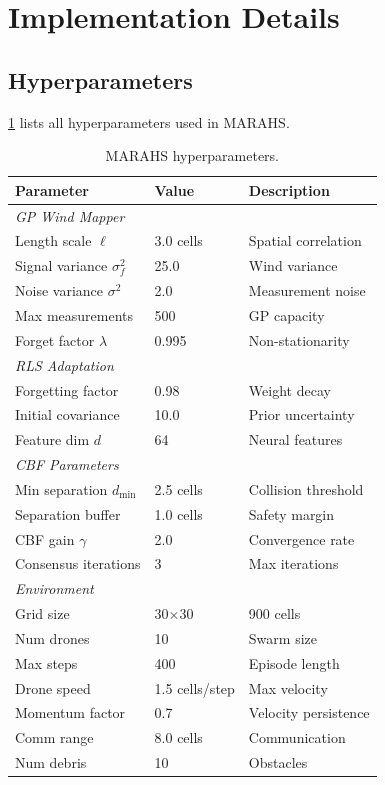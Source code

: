 \documentclass[11pt,twocolumn]{article}
\providecommand{\Cref}[1]{\ref{#1}}
\theoremstyle{definition}
\begin{document}
\section{Implementation Details}
\label{app:implementation}

\subsection{Hyperparameters}

\Cref{tab:hyperparameters} lists all hyperparameters used in MARAHS.

\begin{table}[h]
\centering
\caption{MARAHS hyperparameters.}
\label{tab:hyperparameters}
\small
\begin{tabular}{lll}
\toprule
\textbf{Parameter} & \textbf{Value} & \textbf{Description} \\
\midrule
\multicolumn{3}{l}{\textit{GP Wind Mapper}} \\
Length scale $\ell$ & 3.0 cells & Spatial correlation \\
Signal variance $\sigma_f^2$ & 25.0 & Wind variance \\
Noise variance $\sigma^2$ & 2.0 & Measurement noise \\
Max measurements & 500 & GP capacity \\
Forget factor $\lambda$ & 0.995 & Non-stationarity \\
\midrule
\multicolumn{3}{l}{\textit{RLS Adaptation}} \\
Forgetting factor & 0.98 & Weight decay \\
Initial covariance & 10.0 & Prior uncertainty \\
Feature dim $d$ & 64 & Neural features \\
\midrule
\multicolumn{3}{l}{\textit{CBF Parameters}} \\
Min separation $d_{\min}$ & 2.5 cells & Collision threshold \\
Separation buffer & 1.0 cells & Safety margin \\
CBF gain $\gamma$ & 2.0 & Convergence rate \\
Consensus iterations & 3 & Max iterations \\
\midrule
\multicolumn{3}{l}{\textit{Environment}} \\
Grid size & 30$\times$30 & 900 cells \\
Num drones & 10 & Swarm size \\
Max steps & 400 & Episode length \\
Drone speed & 1.5 cells/step & Max velocity \\
Momentum factor & 0.7 & Velocity persistence \\
Comm range & 8.0 cells & Communication \\
Num debris & 10 & Obstacles \\
\bottomrule
\end{tabular}
\end{table}
\end{document}
